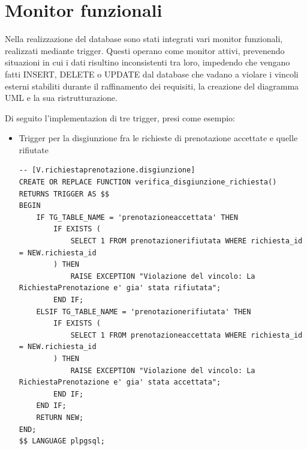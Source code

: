 \documentclass[12pt]{report}
\begin{document}
    \newpage
    \section{Monitor funzionali}
    
    Nella realizzazione del database sono stati integrati vari monitor funzionali, realizzati mediante trigger. Questi operano come monitor attivi, prevenendo situazioni in cui i dati risultino inconsistenti tra loro, impedendo che vengano fatti INSERT, DELETE o UPDATE dal database che vadano a violare i vincoli esterni stabiliti durante il raffinamento dei requisiti, la creazione del diagramma UML e la sua ristrutturazione.

    Di seguito l'implementazion di tre trigger, presi come esempio:

    \begin{itemize}
    \item Trigger per la disgiunzione fra le richieste di prenotazione accettate e quelle rifiutate

    \begin{lstlisting}
-- [V.richiestaprenotazione.disgiunzione]
CREATE OR REPLACE FUNCTION verifica_disgiunzione_richiesta()
RETURNS TRIGGER AS $$
BEGIN
    IF TG_TABLE_NAME = 'prenotazioneaccettata' THEN
        IF EXISTS (
            SELECT 1 FROM prenotazionerifiutata WHERE richiesta_id = NEW.richiesta_id
        ) THEN
            RAISE EXCEPTION "Violazione del vincolo: La RichiestaPrenotazione e' gia' stata rifiutata";
        END IF;
    ELSIF TG_TABLE_NAME = 'prenotazionerifiutata' THEN
        IF EXISTS (
            SELECT 1 FROM prenotazioneaccettata WHERE richiesta_id = NEW.richiesta_id
        ) THEN
            RAISE EXCEPTION "Violazione del vincolo: La RichiestaPrenotazione e' gia' stata accettata";
        END IF;
    END IF;
    RETURN NEW;
END;
$$ LANGUAGE plpgsql;


\end{lstlisting}
\end{itemize}
\end{document}
